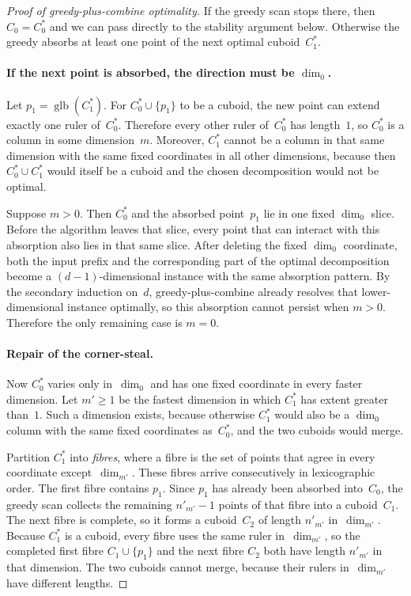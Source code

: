\documentclass[manuscript,screen,review]{acmart}
\theoremstyle{definition}
\theoremstyle{plain}
\begin{document}
\begin{proof}[Proof of greedy-plus-combine optimality]
If the greedy scan stops there, then $C_0 = C^*_0$ and we can pass directly to the stability argument below. Otherwise the greedy absorbs at least one point of the next optimal cuboid~$C^*_1$.

\paragraph{If the next point is absorbed, the direction must be $\dim_0$.}
Let $p_1 = \operatorname{glb}(C^*_1)$. For $C^*_0 \cup \{p_1\}$ to
be a cuboid, the new point can extend exactly one ruler of~$C^*_0$.
Therefore every other ruler of~$C^*_0$ has length~$1$, so $C^*_0$ is
a column in some dimension~$m$. Moreover, $C^*_1$ cannot be a column
in that same dimension with the same fixed coordinates in all other
dimensions, because then $C^*_0 \cup C^*_1$ would itself be a cuboid
and the chosen decomposition would not be optimal.

Suppose $m > 0$. Then $C^*_0$ and the absorbed point~$p_1$ lie in one fixed $\dim_0$ slice. Before the algorithm leaves that slice, every point that can interact with this absorption also lies in that same slice. After deleting the fixed $\dim_0$ coordinate, both the input prefix and the corresponding part of the optimal decomposition become a $(d{-}1)$-dimensional instance with the same absorption pattern. By the secondary induction on~$d$, greedy-plus-combine already resolves that lower-dimensional instance optimally, so this absorption cannot persist when $m > 0$. Therefore the only remaining case is $m = 0$.

\paragraph{Repair of the corner-steal.}
Now $C^*_0$ varies only in~$\dim_0$ and has one fixed coordinate in every faster dimension. Let $m' \geq 1$ be the fastest dimension in which $C^*_1$ has extent greater than~$1$. Such a dimension exists, because otherwise $C^*_1$ would also be a $\dim_0$ column with the same fixed coordinates as~$C^*_0$, and the two cuboids would merge.

Partition $C^*_1$ into \emph{fibres}, where a fibre is the set of
points that agree in every coordinate except~$\dim_{m'}$. These fibres
arrive consecutively in lexicographic order. The first fibre contains
$p_1$. Since $p_1$ has already been absorbed into~$C_0$, the greedy
scan collects the remaining $n'_{m'} - 1$ points of that fibre into a
cuboid~$C_1$. The next fibre is complete, so it forms a cuboid~$C_2$
of length $n'_{m'}$ in~$\dim_{m'}$. Because $C^*_1$ is a cuboid,
every fibre uses the same ruler in~$\dim_{m'}$, so the completed
first fibre $C_1 \cup \{p_1\}$ and the next fibre $C_2$ both have
length $n'_{m'}$ in that dimension. The two cuboids cannot merge,
because their rulers in~$\dim_{m'}$ have different lengths.


\end{proof}
\end{document}
